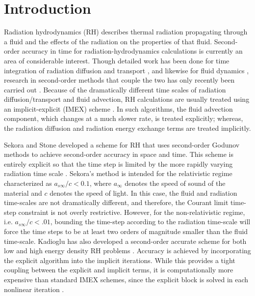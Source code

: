 \documentclass[preprint,12pt]{elsarticle}
\begin{document}
\section{Introduction}
\label{sec:Introduction}

Radiation hydrodynamics (RH) describes thermal radiation propagating through a fluid and the effects of the radiation on the properties of that fluid.  
Second-order accuracy in time for radiation-hydrodynamics calculations is currently an area of considerable interest.  Though detailed work has been 
done for time integration of radiation diffusion and transport \cite{mcclarren,lowrie2,knoll,olson,axelrod,stone,brown}, and likewise for fluid 
dynamics \cite{toro}, research in second-order methods that couple the two has only recently been carried out \cite{lowrie,bates,dai}.  Because of the 
dramatically different time scales of radiation diffusion/transport and fluid advection, RH calculations are usually treated using an implicit-explicit 
(IMEX) scheme \cite{lowrie, bates,dai}.  In such algorithms, the fluid advection component, which changes at a much slower rate, is treated explicitly; 
whereas, the radiation diffusion and radiation energy exchange terms are treated implicitly.  

Sekora and Stone developed a scheme for RH that uses second-order Godunov methods to achieve second-order accuracy in space and time.  This scheme is 
entirely explicit so that the time step is limited by the more rapidly varying radiation time scale \cite{sekora}.  Sekora's method is intended for the 
relativistic regime characterized as $a_{s\infty}/c < 0.1$, where $a_{\infty}$ denotes the speed of sound of the material and $c$ denotes the speed of light.  In this case, 
the fluid and radiation time-scales are not dramatically different, and therefore, the Courant limit time-step constraint is not overly restrictive.  
However, for the non-relativistic regime, i.e. $a_{s\infty}/c < .01$, bounding the time-step according to the radiation time-scale will force the time steps 
to be at least two orders of magnitude smaller than the fluid time-scale.  Kadioglu has also developed a second-order accurate scheme for both low and 
high energy density RH problems \cite{kadioglu,kadioglu2}.  Accuracy is achieved by incorporating the explicit algorithm into the implicit iterations. 
While this provides a tight coupling between the explicit and implicit terms, it is computationally more expensive than standard IMEX schemes, since the 
explicit block is solved in each nonlinear iteration \cite{kadioglu}.
\end{document}
